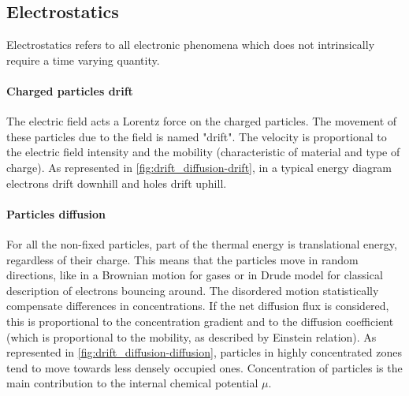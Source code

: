 \subsection{Electrostatics}
Electrostatics refers to all electronic phenomena which does not intrinsically require a time varying quantity.


\begin{figure}
\end{figure}

		\paragraph{Charged particles drift}\label{intro_drift}
		The electric field acts a Lorentz force on the charged particles.
		The movement of these particles due to the field is named "drift".
		The velocity is proportional to the electric field intensity and the mobility (characteristic of material and type of charge).
		As represented in \cref{fig:drift_diffusion-drift}, in a typical energy diagram electrons drift downhill and holes drift uphill.

\paragraph{Particles diffusion}\label{intro_diffusion}
For all the non-fixed particles, part of the thermal energy is translational energy, regardless of their charge.
This means that the particles move in random directions, like in a Brownian motion for gases or in Drude model for classical description of electrons bouncing around.
The disordered motion statistically compensate differences in concentrations.
If the net diffusion flux is considered, this is proportional to the concentration gradient and to the diffusion coefficient (which is proportional to the mobility, as described by Einstein relation).
As represented in \cref{fig:drift_diffusion-diffusion}, particles in highly concentrated zones tend to move towards less densely occupied ones.
Concentration of particles is the main contribution to the internal chemical potential $\mu$.

